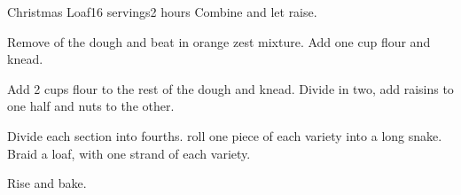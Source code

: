 \documentclass[../Cookbook.tex]{subfiles}
\begin{document}
\begin{recipe}[ChristmasLoaf]{Christmas Loaf}{16 servings}{2 hours}
Combine and let raise.

Remove  of the dough and beat in orange zest mixture. %
Add one cup flour and knead.

Add 2 cups flour to the rest of the dough and knead. Divide in two, add raisins to one half and nuts to the other.

Divide each section into fourths. roll one piece of each variety into a long snake. Braid a loaf, with one strand of each variety.

Rise and bake.
\end{recipe}
\end{document}
